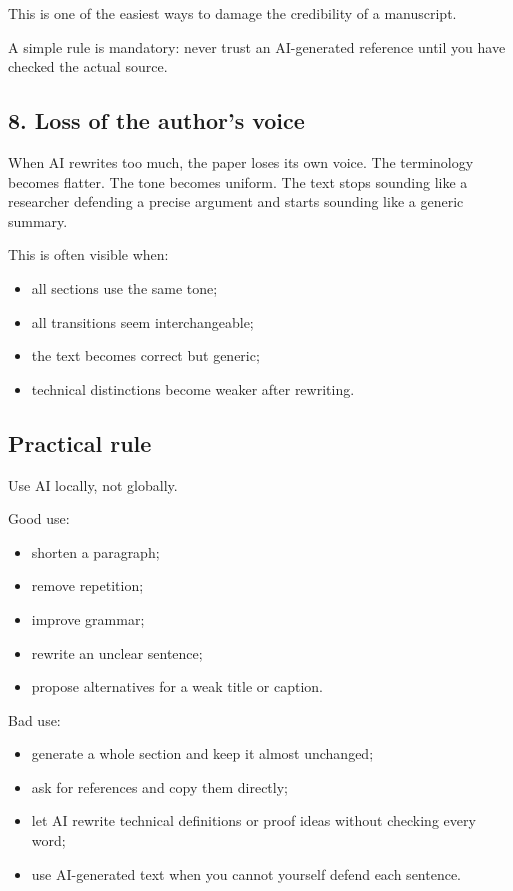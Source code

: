 \documentclass[11pt,a4paper]{article}
\theoremstyle{definition}
\begin{document}
This is one of the easiest ways to damage the credibility of a manuscript.

A simple rule is mandatory:
never trust an AI-generated reference until you have checked the actual source.

\subsection*{8. Loss of the author's voice}

When AI rewrites too much, the paper loses its own voice.
The terminology becomes flatter.
The tone becomes uniform.
The text stops sounding like a researcher defending a precise argument and starts sounding like a generic summary.

This is often visible when:
\begin{itemize}
    \item all sections use the same tone;
    \item all transitions seem interchangeable;
    \item the text becomes correct but generic;
    \item technical distinctions become weaker after rewriting.
\end{itemize}

\subsection*{Practical rule}

Use AI locally, not globally.

Good use:
\begin{itemize}
    \item shorten a paragraph;
    \item remove repetition;
    \item improve grammar;
    \item rewrite an unclear sentence;
    \item propose alternatives for a weak title or caption.
\end{itemize}

Bad use:
\begin{itemize}
    \item generate a whole section and keep it almost unchanged;
    \item ask for references and copy them directly;
    \item let AI rewrite technical definitions or proof ideas without checking every word;
    \item use AI-generated text when you cannot yourself defend each sentence.
\end{itemize}
\end{document}
